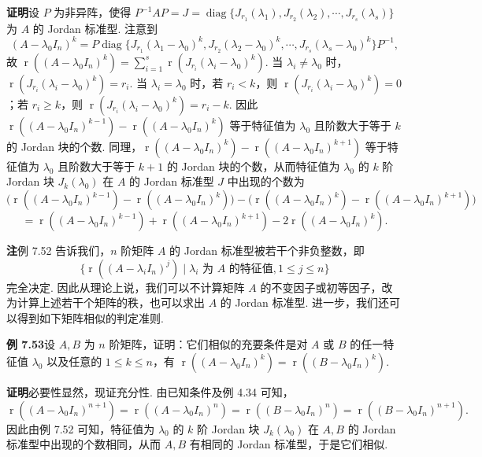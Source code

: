 \documentclass[UTF8, 12pt, fontset=fandol, oneside]{ctexart}
\begin{document}
\noindent\textbf{证明}\quad 设 $P$ 为非异阵，使得 $P^{-1}AP=J=\operatorname{diag}\{J_{r_1}(\lambda_1),J_{r_2}(\lambda_2),\cdots,J_{r_s}(\lambda_s)\}$ 为 $A$ 的 Jordan 标准型. 注意到
\[
(A-\lambda_0I_n)^k
=P\operatorname{diag}\{J_{r_1}(\lambda_1-\lambda_0)^k,J_{r_2}(\lambda_2-\lambda_0)^k,\cdots,J_{r_s}(\lambda_s-\lambda_0)^k\}P^{-1},
\]
故 $\operatorname{r}((A-\lambda_0I_n)^k)=\sum\limits_{i=1}^s\operatorname{r}(J_{r_i}(\lambda_i-\lambda_0)^k)$. 当 $\lambda_i\ne\lambda_0$ 时，$\operatorname{r}(J_{r_i}(\lambda_i-\lambda_0)^k)=r_i$. 当 $\lambda_i=\lambda_0$ 时，若 $r_i<k$，则 $\operatorname{r}(J_{r_i}(\lambda_i-\lambda_0)^k)=0$；若 $r_i\ge k$，则 $\operatorname{r}(J_{r_i}(\lambda_i-\lambda_0)^k)=r_i-k$. 因此 $\operatorname{r}((A-\lambda_0I_n)^{k-1})-\operatorname{r}((A-\lambda_0I_n)^k)$ 等于特征值为 $\lambda_0$ 且阶数大于等于 $k$ 的 Jordan 块的个数. 同理，$\operatorname{r}((A-\lambda_0I_n)^k)-\operatorname{r}((A-\lambda_0I_n)^{k+1})$ 等于特征值为 $\lambda_0$ 且阶数大于等于 $k+1$ 的 Jordan 块的个数，从而特征值为 $\lambda_0$ 的 $k$ 阶 Jordan 块 $J_k(\lambda_0)$ 在 $A$ 的 Jordan 标准型 $J$ 中出现的个数为
\[
\bigl(\operatorname{r}((A-\lambda_0I_n)^{k-1})-\operatorname{r}((A-\lambda_0I_n)^k)\bigr)
-\bigl(\operatorname{r}((A-\lambda_0I_n)^k)-\operatorname{r}((A-\lambda_0I_n)^{k+1})\bigr)
\]
\[
=\operatorname{r}((A-\lambda_0I_n)^{k-1})+\operatorname{r}((A-\lambda_0I_n)^{k+1})
-2\operatorname{r}((A-\lambda_0I_n)^k).
\]

\noindent\textbf{注}\quad 例 7.52 告诉我们，$n$ 阶矩阵 $A$ 的 Jordan 标准型被若干个非负整数，即
\[
\{\operatorname{r}((A-\lambda_iI_n)^j)\mid \lambda_i\text{ 为 }A\text{ 的特征值},1\le j\le n\}
\]
完全决定. 因此从理论上说，我们可以不计算矩阵 $A$ 的不变因子或初等因子，改为计算上述若干个矩阵的秩，也可以求出 $A$ 的 Jordan 标准型. 进一步，我们还可以得到如下矩阵相似的判定准则.

\noindent\textbf{例 7.53}\quad 设 $A,B$ 为 $n$ 阶矩阵，证明：它们相似的充要条件是对 $A$ 或 $B$ 的任一特征值 $\lambda_0$ 以及任意的 $1\le k\le n$，有 $\operatorname{r}((A-\lambda_0I_n)^k)=\operatorname{r}((B-\lambda_0I_n)^k)$.

\noindent\textbf{证明}\quad 必要性显然，现证充分性. 由已知条件及例 4.34 可知，
\[
\operatorname{r}((A-\lambda_0I_n)^{n+1})=\operatorname{r}((A-\lambda_0I_n)^n)
=\operatorname{r}((B-\lambda_0I_n)^n)=\operatorname{r}((B-\lambda_0I_n)^{n+1}).
\]
因此由例 7.52 可知，特征值为 $\lambda_0$ 的 $k$ 阶 Jordan 块 $J_k(\lambda_0)$ 在 $A,B$ 的 Jordan 标准型中出现的个数相同，从而 $A,B$ 有相同的 Jordan 标准型，于是它们相似.
\end{document}
